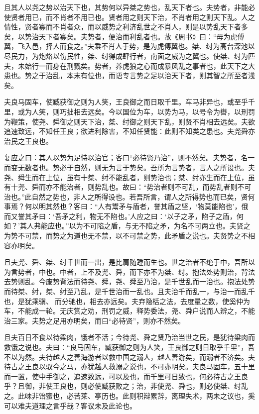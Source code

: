 \documentclass[]{article}
\begin{document}
且其人以尧之势以治天下也，其势何以异桀之势也，乱天下者也。夫势者，非能必使贤者用已，而不肖者不用已也。贤者用之则天下治，不肖者用之则天下乱。人之情性，贤者寡而不肖者众，而以威势之利济乱世之不肖人，则是以势乱天下者多矣，以势治天下者寡矣。夫势者，便治而利乱者也。故《周书》曰：``毋为虎傅翼，飞入邑，择人而食之。''夫乘不肖人于势，是为虎傅翼也。桀、纣为高台深池以尽民力，为炮烙以伤民性，桀、纣得成肆行者，南面之威为之翼也。使桀、纣为匹夫，未始行一而身在刑戮矣。势者，养虎狼之心而成暴风乱之事者也，此天下之大患也。势之于治乱，本末有位也，而语专言势之足以治天下者，则其智之所至者浅矣。

夫良马固车，使臧获御之则为人笑，王良御之而日取千里。车马非异也，或至乎千里，或为人笑，则巧拙相去远矣。今以国位为车，以势为马，以号令为辔，以刑罚为鞭策，使尧、舜御之则天下治，桀、纣御之则天下乱，则贤不肖相去远矣。夫欲追速致远，不知任王良；欲进利除害，不知任贤能：此则不知类之患也。夫尧舜亦治民之王良也。

复应之曰：其人以势为足恃以治官；客曰``必待贤乃治''，则不然矣。夫势者，名一而变无数者也。势必于自然，则无为言于势矣。吾所为言势者，言人之所设也。夫尧、舜生而在上位，虽有十桀、纣不能乱者，则势治也；桀、纣亦生而在上位，虽有十尧、舜而亦不能治者，则势乱也。故曰：``势治者则不可乱，而势乱者则不可治也。''此自然之势也，非人之所得设也。若吾所言，谓人之所得势也而已矣，贤何事焉？何以明其然也？客曰：``人有鬻矛与盾者，誉其盾之坚，`物莫能陷也'，俄而又誉其矛曰：`吾矛之利，物无不陷也。'人应之曰：`以子之矛，陷子之盾，何如？'其人弗能应也。''以为不可陷之盾，与无不陷之矛，为名不可两立也。夫贤之为势不可禁，而势之为道也无不禁，以不可禁之势，此矛盾之说也。夫贤势之不相容亦明矣。

且夫尧、舜、桀、纣千世而一出，是比肩随踵而生也。世之治者不绝于中，吾所以为言势者，中也。中者，上不及尧、舜，而下亦不为桀、纣。抱法处势则治，背法去势则乱。今废势背法而待尧、舜，尧、舜至乃治，是千世乱而一治也。抱法处势而待桀、纣，桀、纣至乃乱，是千世治而一乱也。且夫治千而乱一，与治一而乱千也，是犹乘骥、而分驰也，相去亦远矣。夫弃隐栝之法，去度量之数，使奚仲为车，不能成一轮。无庆赏之劝，刑罚之威，释势委法，尧、舜户说而人辨之，不能治三家。夫势之足用亦明矣，而曰``必待贤''，则亦不然矣。

且夫百日不食以待粱肉，饿者不活；今待尧、舜之贤乃治当世之民，是犹待粱肉而救饿之说也。夫曰：``良马固车，臧获御之则为人笑，王良御之则日取乎千里''，吾不以为然。夫待越人之善海游者以救中国之溺人，越人善游矣，而溺者不济矣。夫待古之王良以驭今之马，亦犹越人救溺之说也，不可亦明矣。夫良马固车，五十里而一置，使中手御之，追速致远，可以及也，而千里可日致也，何必待古之王良乎？且御，非使王良也，则必使臧获败之；治，非使尧、舜也，则必使桀、纣乱之。此味非饴蜜也，必苦莱、亭历也。此则积辩累辞，离理失术，两未之议也，奚可以难夫道理之言乎哉？客议未及此论也。
\end{document}
